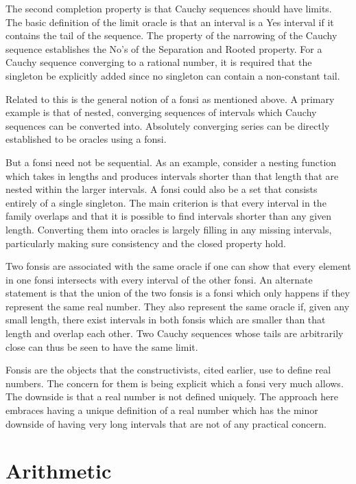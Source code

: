 \documentclass[12pt]{article}
\begin{document}
The second completion property is that Cauchy sequences should have limits. The basic definition of the limit oracle is that an interval is a Yes interval if it contains the tail of the sequence. The property of the narrowing of the Cauchy sequence establishes the No's of the Separation and Rooted property. For a Cauchy sequence converging to a rational number, it is required that the singleton be explicitly added since no singleton can contain a non-constant tail.

Related to this is the general notion of a fonsi as mentioned above. A primary example is that of nested, converging sequences of intervals which Cauchy sequences can be converted into. Absolutely converging series can be directly established to be oracles using a fonsi. 

But a fonsi need not be sequential. As an example, consider a nesting function which takes in lengths and produces intervals shorter than that length that are nested within the larger intervals. A fonsi could also be a set that consists entirely of a single singleton. The main criterion is that every interval in the family overlaps and that it is possible to find intervals shorter than any given length. Converting them into oracles is largely filling in any missing intervals, particularly making sure consistency and the closed property hold.  

Two fonsis are associated with the same oracle if one can show that every element in one fonsi intersects with every interval of the other fonsi. An alternate statement is that the union of the two fonsis is a fonsi which only happens if they represent the same real number. They also represent the same oracle if, given any small length, there exist intervals in both fonsis which are smaller than that length and overlap each other. Two Cauchy sequences whose tails are arbitrarily close can thus be seen to have the same limit. 

Fonsis are the objects that the constructivists, cited earlier, use to define real numbers. The concern for them is being explicit which a fonsi very much allows. The downside is that a real number is not defined uniquely. The approach here embraces having a unique definition of a real number which has the minor downside of having very long intervals that are not of any practical concern. 

\section{Arithmetic}
\end{document}

